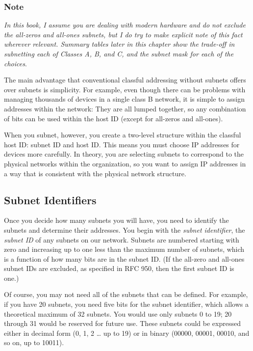 \subsubsection[Note]{\texorpdfstring{\protect\hypertarget{ch18s05.htmlux5cux23note-73}{}{}Note}{Note}}

{\emph{In this book, I assume you are dealing with modern hardware and
do not exclude the all-zeros and all-ones subnets, but I do try to make
explicit note of this fact wherever relevant. Summary tables later in
this chapter show the trade-off in subnetting each of Classes A, B, and
C, and the subnet mask for each of the choices}}.

\protect\hypertarget{ch18s06.html}{}{}

\protect\hypertarget{ch18s06.htmlux5cux23idx-CHP-18-0739}{}{}The main
advantage that conventional classful addressing without subnets offers
over subnets is simplicity. For example, even though there can be
problems with managing thousands of devices in a single class B network,
it is simple to assign addresses within the network: They are all lumped
together, so any combination of bits can be used within the host ID
(except for all-zeros and all-ones).

When you subnet, however, you create a two-level structure within the
classful host ID: subnet ID and host ID. This means you must choose IP
addresses for devices more carefully. In theory, you are selecting
subnets to correspond to the physical networks within the organization,
so you want to assign IP addresses in a way that is consistent with the
physical network structure.

\subsection[Subnet
Identifiers]{\texorpdfstring{\protect\hypertarget{ch18s06.htmlux5cux23subnet_identifiers}{}{}Subnet
Identifiers}{Subnet Identifiers}}

Once you decide how many subnets you will have, you need to identify the
subnets and determine their addresses. You begin with the {\emph{subnet
identifier}}, the {\emph{subnet ID}} of any subnets on our network.
Subnets are numbered starting with zero and increasing up to one less
than the maximum number of subnets, which is a function of how many bits
are in the subnet ID. (If the all-zero and all-ones subnet IDs are
excluded, as specified in RFC 950, then the first subnet ID is one.)

Of course, you may not need all of the subnets that can be defined. For
example, if you have 20 subnets, you need five bits for the subnet
identifier, which allows a theoretical maximum of 32 subnets. You would
use only subnets 0 to 19; 20 through 31 would be reserved for future
use. These subnets could be expressed either in decimal form (0, 1, 2
\ldots{} up to 19) or in binary (00000, 00001, 00010, and so on, up to
10011).


